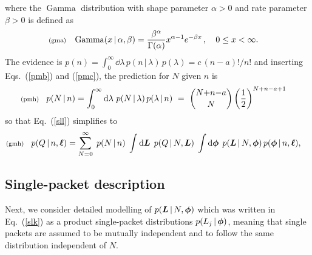 \documentclass[11pt]{article}
\newcommand{\lleq}[1]{\label{#1} }
\renewcommand{\lleq}[1]{\label{#1} {\scriptstyle {\rm (#1)}} \hspace*{2ex} }
\newcommand{\cond}{\,|\,}
\DeclareMathOperator{\GammaDist}{Gamma}
\newcommand{\rmdx}[1]{\dd{#1}} %
\begin{document}
where the $\GammaDist$ distribution with shape parameter $\alpha > 0$ and
rate parameter $\beta > 0$ is defined as
\begin{align}
  \lleq{gma}
  \GammaDist(x\cond \alpha, \beta)
  &= \frac{\beta^\alpha}{\Gamma(\alpha)} x^{\alpha-1} e^{-\beta x}\,,
  \quad 0 \leq x < \infty.
\end{align}
The evidence is
$p(n) =  \int_0^\infty \rmdx{\lambda}\, p(n\cond\lambda)\,p(\lambda) = c\,(n-a)!/n!$
and inserting Eqs.~(\ref{pmb}) and (\ref{pmc}), the prediction for $N$
given $n$ is
\begin{align}
  \lleq{pmh}
  p(N\cond n) %
  &= \int_0^\infty \rmdx{\lambda}\, p(N\cond\lambda)\,p(\lambda\cond n)
  \ =\ \binom{N{+}n{-}a}{N} \left(\frac{1}{2}\right)^{N+n-a+1}
\end{align}
so that Eq.~(\ref{sll}) simplifies to
\begin{align}
  \lleq{gmh}
  p(Q\cond n,\bml)
  &= \sum_{N=0}^\infty \;
    p(N\cond n)\;
    \int \rmdx{\bmL}\;
    p(Q\cond N,\bmL)\;
    \int \rmdx{\bmphi}\;
    p(\bmL\cond N,\bmphi)\,
    p(\bmphi\cond n,\bml),
\end{align}

\subsection{Single-packet description}

Next, we consider detailed modelling of $p(\bmL\cond N,\bmphi)$ which
was written in Eq.~(\ref{slk}) as a product single-packet
distributions $p(L_j\cond \bmphi)$, meaning that single packets are
assumed to be mutually independent and to follow the same distribution
independent of $N$.
\end{document}
